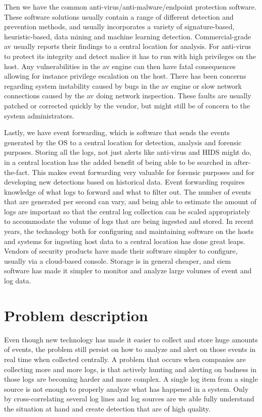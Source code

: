 Then we have the common anti-virus/anti-malware/endpoint protection software. These software solutions usually contain a range of different detection and prevention methods, and usually incorporates a variety of signature-based, heuristic-based, data mining and machine learning detection. Commercial-grade \acrfull{av} usually reports their findings to a central location for analysis. For anti-virus to protect its integrity and detect malice it has to run with high privileges on the host. Any vulnerabilities in the \acrshort{av} engine can then have fatal consequences allowing for instance privilege escalation on the host. There has been concerns regarding system instability caused by bugs in the \acrshort{av} engine or slow network connections caused by the \acrshort{av} doing network inspection. These faults are usually patched or corrected quickly by the vendor, but might still be of concern to the system administrators.

Lastly, we have event forwarding, which is software that sends the events generated by the OS to a central location for detection, analysis and forensic purposes. Storing all the logs, not just alerts like anti-virus and HIDS might do, in a central location has the added benefit of being able to be searched in after-the-fact. This makes event forwarding very valuable for forensic purposes and for developing new detections based on historical data.
Event forwarding requires knowledge of what logs to forward and what to filter out. The number of events that are generated per second can vary, and being able to estimate the amount of logs are important so that the central log collection can be scaled appropriately to accommodate the volume of logs that are being ingested and stored.
In recent years, the technology both for configuring and maintaining software on the hosts and systems for ingesting host data to a central location has done great leaps. Vendors of security products have made their software simpler to configure, usually via a cloud-based console. Storage is in general cheaper, and \acrfull{siem} software has made it simpler to monitor and analyze large volumes of event and log data.

\section{Problem description}
\label{sec:problemdescription}
Even though new technology has made it easier to collect and store huge amounts of events, the problem still persist on how to analyze and alert on those events in real time when collected centrally.
A problem that occurs when companies are collecting more and more logs, is that actively hunting and alerting on badness in those logs are becoming harder and more complex. A single log item from a single source is not enough to properly analyze what has happened in a system. Only by cross-correlating several log lines and log sources are we able fully understand the situation at hand and create detection that are of high quality.

